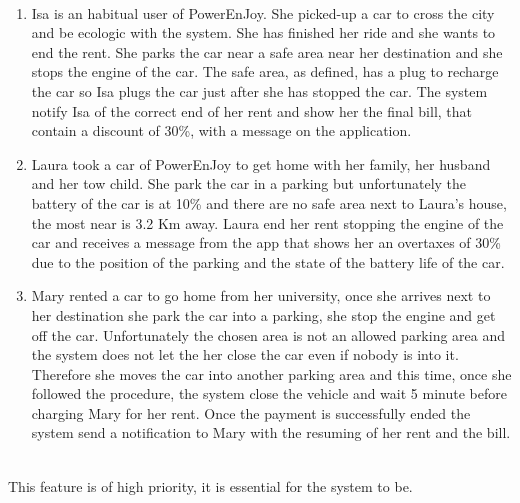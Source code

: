  \ \\
\begin{enumerate}
	\item Isa is an habitual user of PowerEnJoy. She picked-up a car to cross the city and be ecologic with the system. She has finished her ride and she wants to end the rent. She parks the car near a safe area near her destination and she stops the engine of the car. The safe area, as defined, has a plug to recharge the car so Isa plugs the car just after she has stopped the car. The system notify Isa of the correct end of her rent and show her the final bill, that contain a discount of 30\%, with a message on the application.
	\item Laura took a car of PowerEnJoy to get home with her family, her husband and her tow child. She park the car in a parking but unfortunately the battery of the car is at 10\% and there are no safe area next to Laura's house, the most near is 3.2 Km away. Laura end her rent stopping the engine of the car and receives a message from the app that shows her an overtaxes of 30\% due to the position of the parking and the state of the battery life of the car.
	\item Mary rented a car to go home from her university, once she arrives next to her destination she park the car into a parking, she stop the engine and get off the car. Unfortunately the chosen area is not an allowed parking area and the system does not let the her close the car even if nobody is into it. Therefore she moves the car into another parking area and this time, once she followed the procedure, the system close the vehicle and wait 5 minute before charging Mary for her rent. Once the payment is successfully ended the system send a notification to Mary with the resuming of her rent and the bill.
\end{enumerate}
 \ \\
This feature is of high priority, it is essential for the system to be.
